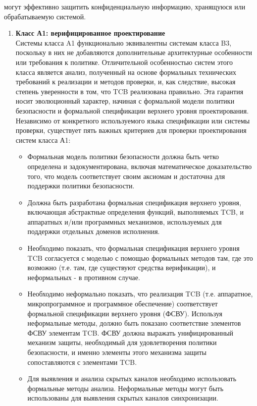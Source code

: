\begin{enumerate}
	могут эффективно защитить конфиденциальную информацию, хранящуюся или обрабатываемую системой.
	\begin{enumerate}
		\item{\textbf{Класс А1: верифицированное проектирование}}\\
		Системы класса A1 функционально эквивалентны системам класса B3, поскольку в них не добавляются дополнительные архитектурные особенности или требования к политике. Отличительной
		особенностью систем этого класса является анализ, полученный на основе формальных технических требований к реализации и методов проверки, и, как следствие, высокая степень
		уверенности в том, что TCB реализована правильно. Эта гарантия носит эволюционный характер, начиная с формальной модели политики безопасности и формальной спецификации верхнего
		уровня проектирования. Независимо от конкретного используемого языка спецификации или системы проверки, существует пять важных критериев для проверки проектирования систем класса А1:
		\begin{itemize}
			\item{}  Формальная модель политики безопасности должна быть четко определена и задокументирована, включая математическое доказательство того, что модель соответствует
			своим аксиомам и достаточна для поддержки политики безопасности.
			\item{} Должна быть разработана формальная спецификация верхнего уровня, включающая абстрактные определения функций, выполняемых TCB, и аппаратных и/или программных механизмов,
			используемых для поддержки отдельных доменов исполнения.
			\item{} Необходимо показать, что формальная спецификация верхнего уровня TCB согласуется с моделью с помощью формальных методов там, где это возможно
			(т.е. там, где существуют средства верификации), и неформальных - в противном случае.
			\item{} Необходимо неформально показать, что реализация TCB (т.е. аппаратное, микропрограммное и программное обеспечение) соответствует формальной спецификации верхнего уровня (ФСВУ).
			Используя неформальные методы, должно быть показано соответствие элементов ФСВУ элементам TCB. ФСВУ должна выражать унифицированный механизм защиты, необходимый для удовлетворения политики
			безопасности, и именно элементы этого механизма защиты сопоставляются с элементами TCB.
			\item{} Для выявления и анализа скрытых каналов необходимо использовать формальные методы анализа. Неформальные методы могут быть использованы для выявления скрытых каналов синхронизации.

\end{itemize}
\end{enumerate}
\end{enumerate}
